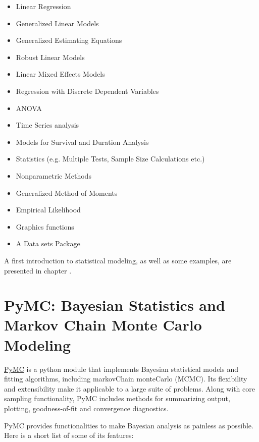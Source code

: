 \begin{itemize}
  \item   Linear Regression
  \item   Generalized Linear Models
  \item   Generalized Estimating Equations
  \item   Robust Linear Models
  \item   Linear Mixed Effects Models
  \item   Regression with Discrete Dependent Variables
  \item   ANOVA
  \item   Time Series analysis
  \item   Models for Survival and Duration Analysis
  \item   Statistics (e.g. Multiple Tests, Sample Size Calculations etc.)
  \item   Nonparametric Methods
  \item   Generalized Method of Moments
  \item   Empirical Likelihood
  \item  Graphics functions
  \item  A Data sets Package
\end{itemize}

A first introduction to statistical modeling, as well as some examples, are presented in chapter .

\section{PyMC: Bayesian Statistics and Markov Chain Monte Carlo Modeling}

\href{http://pymc-devs.github.io/pymc/}{PyMC} is a python module that implements Bayesian statistical models and fitting algorithms, including \gls{markovChain} \gls{monteCarlo} (MCMC). Its flexibility and extensibility make it applicable to a large suite of problems. Along with core sampling functionality, PyMC includes methods for summarizing output, plotting, goodness-of-fit and convergence diagnostics.

PyMC provides functionalities to make Bayesian analysis as painless as possible. Here is a short list of some of its features:


